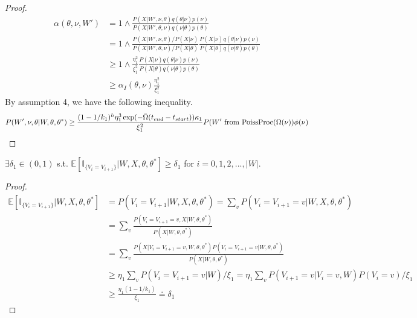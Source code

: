 \begin{proof}
\begin{align*}
\alpha(\theta, \nu, W') &= 1 \wedge \frac{P(X | W', \nu, \theta) q(\theta|\nu)p(\nu)}{P(X | W', \theta, \nu)q(\nu|\theta)p(\theta)}\\
&= 1 \wedge \frac{P(X|W', \nu, \theta) / P(X|\nu)}{P(X|W', \theta, \nu) / P(X|\theta)} \frac{P(X | \nu) q(\theta|\nu)p(\nu)}{P(X | \theta)q(\nu|\theta)p(\theta)}\\
& \geq 1 \wedge \frac{\eta_1^2}{\xi_1^2} 	\frac{P(X | \nu) q(\theta|\nu)p(\nu)}{P(X | \theta)q(\nu|\theta)p(\theta)}\\
& \geq \alpha_I(\theta, \nu)\frac{\eta_1^2}{\xi_1^2}
\end{align*}
By assumption 4, we have the following inequality.
\begin{align*}
P(W', \nu, \theta | W, \theta, \theta^*) \geq \frac{(1 - 1/k_1)^{h}
\eta_1^3 \exp(-\bar{\Omega}(t_{end} - t_{start}))\kappa_1}{\xi_1^2} 
 P(W'
   \text{ from } \text{PoissProc}(\Omega(\nu))\phi(\nu)
\end{align*}
\end{proof}

\begin{lemma}
$\exists \delta_1 \in (0, 1)$ s.t. $\mathbb{E}[\mathbb{I}_{\{V_i = V_{i + 1}\}} | W, X, \theta, \theta^*] \geq \delta_1$ for $i = 0, 1, 2, ..., |W|$. 
\end{lemma}
\begin{proof}
\begin{align*}
\mathbb{E}[\mathbb{I}_{\{V_i = V_{i + 1}\}} | W, X, \theta, \theta^*] &= P(V_i = V_{i + 1} | W, X, \theta, \theta^*) = \sum_v P(V_i = V_{i + 1} = v | W, X, \theta, \theta^*)\\
& =\sum_v \frac{P(V_i = V_{i + 1} = v, X | W, \theta, \theta^*)}{P(X | W, \theta, \theta^*)} \\
&=\sum_v \frac{P(X | V_i = V_{i + 1} = v, W, \theta, \theta^*)P( V_i = V_{i + 1} = v|W, \theta, \theta^*)}{P(X | W, \theta, \theta^*)}\\
& \geq \eta_1\sum_v P(V_i = V_{i + 1} = v | W) /\xi_1 =  \eta_1 \sum_v P(V_{i + 1} = v | V_i = v, W)P(V_i = v) /\xi_1 \\
& \geq \frac{\eta_1 (1 - 1/k_1)}{\xi_1} \doteq \delta_1 
\end{align*}
\end{proof}


